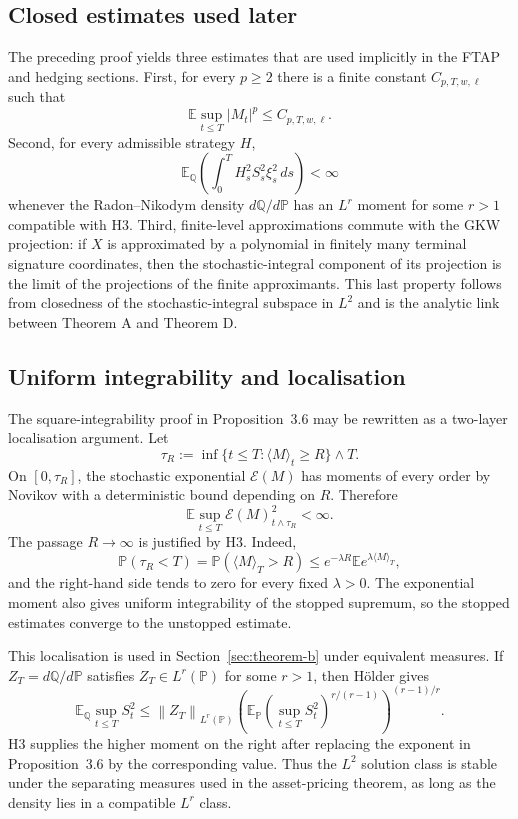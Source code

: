 \documentclass[11pt,oneside]{article}
\theoremstyle{plain}
\theoremstyle{definition}
\theoremstyle{remark}
\newcommand{\E}{\mathbb{E}}
\newcommand{\Q}{\mathbb{Q}}
\newcommand{\Pp}{\mathbb{P}}
\newcommand{\norm}[1]{\left\lVert #1\right\rVert}
\newcommand{\abs}[1]{\left\lvert #1\right\rvert}
\begin{document}
\subsection{Closed estimates used later}
\label{subsec:closed-estimates}
The preceding proof yields three estimates that are used implicitly in the FTAP and hedging sections. First, for every $p\geq2$ there is a finite constant $C_{p,T,w,\ell}$ such that
\[
\E\sup_{t\leq T}\abs{M_t}^p\leq C_{p,T,w,\ell}.
\]
Second, for every admissible strategy $H$,
\[
\E_\Q\left(\int_0^T H_s^2 S_s^2\xi_s^2\,ds\right)<\infty
\]
whenever the Radon--Nikodym density $d\Q/d\Pp$ has an $L^r$ moment for some $r>1$ compatible with H3. Third, finite-level approximations commute with the GKW projection: if $X$ is approximated by a polynomial in finitely many terminal signature coordinates, then the stochastic-integral component of its projection is the limit of the projections of the finite approximants. This last property follows from closedness of the stochastic-integral subspace in $L^2$ and is the analytic link between Theorem A and Theorem D.


\subsection{Uniform integrability and localisation}
\label{subsec:ui-localisation}
The square-integrability proof in Proposition~3.6 may be rewritten as a two-layer localisation argument. Let
\[
\tau_R:=\inf\{t\leq T: \langle M\rangle_t\geq R\}\wedge T.
\]
On $[0,\tau_R]$, the stochastic exponential $\mathcal E(M)$ has moments of every order by Novikov with a deterministic bound depending on $R$. Therefore
\[
\E\sup_{t\leq T}\mathcal E(M)_{t\wedge\tau_R}^2<\infty.
\]
The passage $R\to\infty$ is justified by H3. Indeed,
\[
\Pp(\tau_R<T)=\Pp(\langle M\rangle_T>R)
\leq e^{-\lambda R}\E e^{\lambda\langle M\rangle_T},
\]
and the right-hand side tends to zero for every fixed $\lambda>0$. The exponential moment also gives uniform integrability of the stopped supremum, so the stopped estimates converge to the unstopped estimate.

This localisation is used in Section~\ref{sec:theorem-b} under equivalent measures. If $Z_T=d\Q/d\Pp$ satisfies $Z_T\in L^r(\Pp)$ for some $r>1$, then H\"older gives
\[
\E_\Q\sup_{t\leq T}S_t^2
\leq \norm{Z_T}_{L^r(\Pp)}
\left(\E_\Pp\left(\sup_{t\leq T}S_t^2\right)^{r/(r-1)}\right)^{(r-1)/r}.
\]
H3 supplies the higher moment on the right after replacing the exponent in Proposition~3.6 by the corresponding value. Thus the $L^2$ solution class is stable under the separating measures used in the asset-pricing theorem, as long as the density lies in a compatible $L^r$ class.
\end{document}
